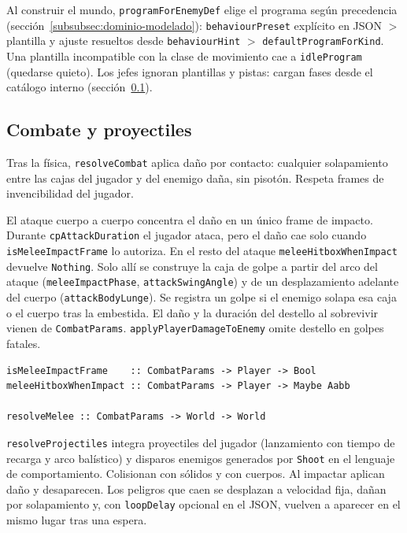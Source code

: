 Al construir el mundo, \texttt{programForEnemy\-Def} elige el programa según
precedencia (sección~\ref{subsubsec:dominio-modelado}): \texttt{behaviour\-Preset}
explícito en JSON $>$ plantilla y ajuste resueltos desde
\texttt{behaviour\-Hint} $>$ \texttt{defaultProgram\-ForKind}. Una plantilla
incompatible con la clase de movimiento cae a \texttt{idleProgram} (quedarse quieto).
Los jefes ignoran plantillas y pistas: cargan fases desde el catálogo interno
(sección~\ref{subsec:combate}).

\subsection{Combate y proyectiles}
\label{subsec:combate}

Tras la física, \texttt{resolveCombat} aplica daño por contacto: cualquier
solapamiento entre las cajas del jugador y del enemigo daña, sin pisotón. Respeta
frames de invencibilidad del jugador.

El ataque cuerpo a cuerpo concentra el daño en un único frame de impacto.
Durante \texttt{cpAttackDuration} el jugador ataca, pero el daño cae solo cuando
\texttt{isMeleeImpactFrame} lo autoriza. En el resto del ataque
\texttt{meleeHitboxWhenImpact} devuelve \texttt{Nothing}. Solo allí se construye
la caja de golpe a partir del arco del ataque (\texttt{meleeImpactPhase},
\texttt{attackSwingAngle}) y de un desplazamiento adelante del cuerpo
(\texttt{attackBodyLunge}). Se registra un golpe si el enemigo solapa esa caja o el
cuerpo tras la embestida. El daño y la duración del destello al sobrevivir vienen de
\texttt{CombatParams}. \texttt{applyPlayerDamageToEnemy} omite destello en golpes
fatales.

\begin{lstlisting}
isMeleeImpactFrame    :: CombatParams -> Player -> Bool
meleeHitboxWhenImpact :: CombatParams -> Player -> Maybe Aabb

resolveMelee :: CombatParams -> World -> World
\end{lstlisting}

\texttt{resolveProjectiles} integra proyectiles del jugador (lanzamiento con
tiempo de recarga y arco balístico) y disparos enemigos generados por \texttt{Shoot} en el
lenguaje de comportamiento. Colisionan con sólidos y con cuerpos. Al impactar aplican daño y desaparecen.
Los peligros que caen se desplazan a velocidad fija, dañan por solapamiento y,
con \texttt{loopDelay} opcional en el JSON, vuelven a aparecer en el mismo lugar tras una espera.

